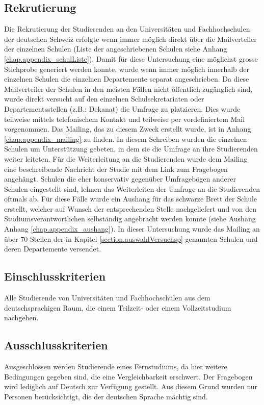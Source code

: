 \subsection{Rekrutierung}\label{subsection.rekrutierung}
Die Rekrutierung der Studierenden an den Universitäten und Fachhochschulen der deutschen Schweiz erfolgte wenn immer möglich direkt über die Mailverteiler der einzelnen Schulen (Liste der angeschriebenen Schulen siehe Anhang \ref{chap.appendix_schulListe}). Damit für diese Untersuchung eine möglichst grosse Stichprobe generiert werden konnte, wurde wenn immer möglich innerhalb der einzelnen Schulen die einzelnen Departemente separat angeschrieben. Da diese Mailverteiler der Schulen in den meisten Fällen nicht öffentlich zugänglich sind, wurde direkt versucht auf den einzelnen Schulsekretariaten oder Departementsstellen (z.B.: Dekanat) die Umfrage zu platzieren. Dies wurde teilweise mittels telefonischem Kontakt und teilweise per vordefiniertem Mail vorgenommen. Das Mailing, das zu diesem Zweck erstellt wurde, ist in Anhang \ref{chap.appendix_mailing} zu finden. In diesem Schreiben wurden die einzelnen Schulen um Unterstützung gebeten, in dem sie die Umfrage an ihre Studierenden weiter leiteten. Für die Weiterleitung an die Studierenden wurde dem Mailing eine beschreibende Nachricht der Studie mit dem Link zum Fragebogen angehängt. Schulen die eher konservativ gegenüber Umfragebögen anderer Schulen eingestellt sind, lehnen das Weiterleiten der Umfrage an die Studierenden oftmals ab. Für diese Fälle wurde ein Aushang für das schwarze Brett der Schule erstellt, welcher auf Wunsch der entsprechenden Stelle nachgeliefert und von den Studiumsverantwortlichen selbständig angebracht werden konnte (siehe Aushang Anhang \ref{chap.appendix_aushang}). In dieser Untersuchung wurde das Mailing an über 70 Stellen der in Kapitel \ref{section.auswahlVersuchsp} genannten Schulen und deren Departemente versendet.

\subsection{Einschlusskriterien}\label{subsection.einschlusskriterien}
Alle Studierende von Universitäten und Fachhochschulen aus dem deutschsprachigen Raum, die einem Teilzeit- oder einem Vollzeitstudium nachgehen.

\subsection{Ausschlusskriterien}\label{subsection.ausschlusskriterien}
Ausgeschlossen werden Studierende eines Fernstudiums, da hier weitere Bedingungen gegeben sind, die eine Vergleichbarkeit erschwert. Der Fragebogen wird lediglich auf Deutsch zur Verfügung gestellt. Aus diesem Grund wurden nur Personen berücksichtigt, die der deutschen Sprache mächtig sind. 


